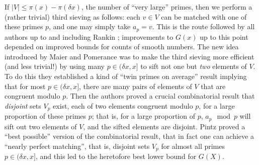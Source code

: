 \documentclass[11pt]{amsart}
\numberwithin{equation}{section}  %
\theoremstyle{remark}
\theoremstyle{plain}
\numberwithin{equation}{section}
\newcommand{\del}{\ensuremath{\delta}}
\renewcommand{\le}{\leqslant}
\renewcommand{\(}{\left(}
\renewcommand{\)}{\right)}
\begin{document}
 If $|V| \le \pi(x)-\pi(\del x)$, the number of 
``very large'' primes, then we perform a (rather trivial) third sieving as follows: each $v \in V$ can be matched with
one of these primes $p$, and one may simply take $a_p=v$. 
This is the route followed by all authors up to and including Rankin \cite{rankin-1963}; improvements 
to $G(x)$ up to this point depended on improved bounds for counts of 
smooth numbers.  
The new idea introduced by Maier and Pomerance \cite{MP} was to make
the third sieving more efficient (and less trivial!) by using many $p
\in (\del x, x]$ to sift not one but \emph{two} elements of $V$. 
To do this they established a kind of 
``twin primes on average'' result implying that for most
$p\in (\del x,x]$, there are many pairs of elements of $V$ that are
 congruent modulo $p$.  Then the authors proved a crucial combinatorial result
 that \emph{disjoint} sets $V_p$ exist, each of two elements congruent
 modulo $p$, for a large proportion of these primes $p$; that is, for
 a large proportion of $p$, $a_p\mod p$ will sift out two elements of
 $V$, and the sifted elements are disjoint.
Pintz \cite{P} proved a ``best possible'' version of the combinatorial
result, that in fact one can achieve a ``nearly perfect matching'',
that is, disjoint sets $V_p$ for almost all primes $p\in (\del x,x]$,
and this led to the heretofore best lower bound for $G(X)$.
\end{document}
